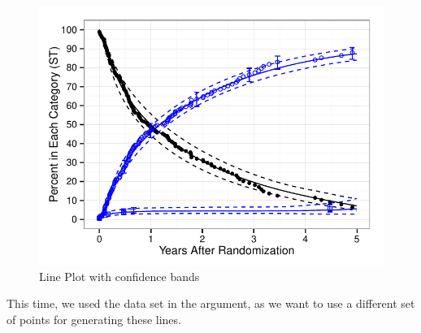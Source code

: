 \documentclass[nojss]{jss}\usepackage[]{graphicx}\usepackage[]{color}
\makeatletter
\def\maxwidth{ %
  \ifdim\Gin@nat@width>\linewidth
    \linewidth
  \else
    \Gin@nat@width
  \fi
}
\newenvironment{knitrout}{}{} %
\makeatother
\begin{document}
\begin{knitrout}
\begin{figure}[htpb]
{\centering \includegraphics[width=\maxwidth]{figure/beamer-lines} 

}

\caption[Line Plot with confidence bands]{Line Plot with confidence bands\label{F:lines}}
\end{figure}


\end{knitrout}

This time, we used the  data set in the  argument, as we want to use a different set of points for generating these lines. 
\end{document}
